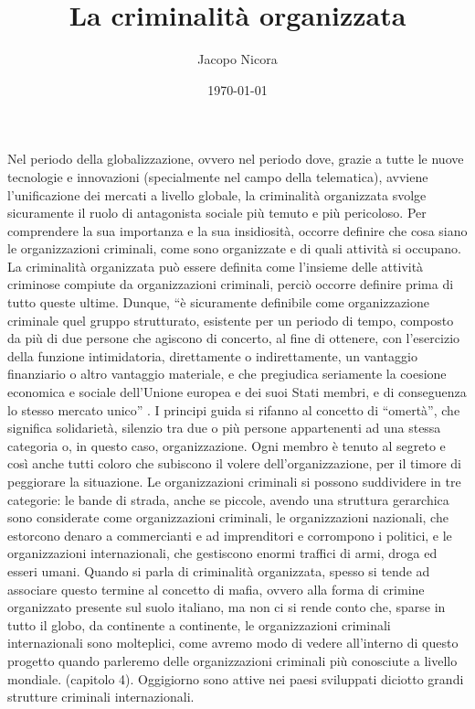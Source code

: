 \documentclass[a4paper, 11pt]{article}
\title{La criminalità organizzata}
\author{Jacopo Nicora}
\date{\today}
\begin{document}
\maketitle

\newpage

\tableofcontents

\newpage



\newpage


Nel periodo della globalizzazione, ovvero nel periodo dove, grazie a tutte le nuove tecnologie e innovazioni (specialmente nel campo della telematica), avviene l’unificazione dei mercati a livello globale, la criminalità organizzata svolge sicuramente il ruolo di antagonista sociale più temuto e più pericoloso. Per comprendere la sua importanza e la sua insidiosità, occorre definire che cosa siano le organizzazioni criminali, come sono organizzate e di quali attività si occupano.
La criminalità organizzata può essere definita come l’insieme delle attività criminose compiute da organizzazioni criminali, perciò occorre definire prima di tutto queste ultime. Dunque, “è sicuramente definibile come organizzazione criminale quel gruppo strutturato, esistente per un periodo di tempo, composto da più di due persone che agiscono di concerto, al fine di ottenere, con l'esercizio della funzione intimidatoria, direttamente o indirettamente, un vantaggio finanziario o altro vantaggio materiale, e che pregiudica seriamente la coesione economica e sociale dell'Unione europea e dei suoi Stati membri, e di conseguenza lo stesso mercato unico” .
I principi guida si rifanno al concetto di “omertà”, che significa solidarietà, silenzio tra due o più persone appartenenti ad una stessa categoria o, in questo caso, organizzazione. Ogni membro è tenuto al segreto e così anche tutti coloro che subiscono il volere dell’organizzazione, per il timore di peggiorare la situazione. Le organizzazioni criminali si possono suddividere in tre categorie: le bande di strada, anche se piccole, avendo una struttura gerarchica sono considerate come organizzazioni criminali, le organizzazioni nazionali, che estorcono denaro a commercianti e ad imprenditori e corrompono i politici, e le organizzazioni internazionali, che gestiscono enormi traffici di armi, droga ed esseri umani. 
Quando si parla di criminalità organizzata, spesso si tende ad associare questo termine al concetto di mafia, ovvero alla forma di crimine organizzato presente sul suolo italiano, ma non ci si rende conto che, sparse in tutto il globo, da continente a continente, le organizzazioni criminali internazionali sono molteplici, come avremo modo di vedere all’interno di questo progetto quando parleremo delle organizzazioni criminali più conosciute a livello mondiale. (capitolo 4). Oggigiorno sono attive nei paesi sviluppati diciotto grandi strutture criminali internazionali.
\end{document}
